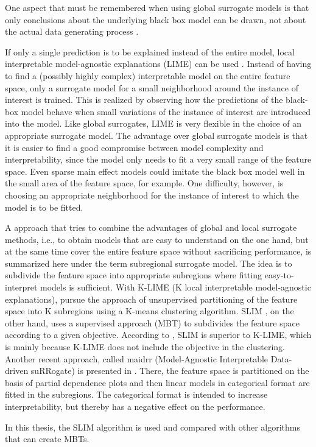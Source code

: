 One aspect that must be remembered when using global surrogate models is that only conclusions about the underlying black box model can be drawn, not about the actual data generating process \citep{Molnar.2019}.


If only a single prediction is to be explained instead of the entire model, local interpretable model-agnostic explanations (LIME) can be used \citep{Ribeiro.2016}. Instead of having to find a (possibly highly complex) interpretable model on the entire feature space, only a surrogate model for a small neighborhood around the instance of interest is trained. This is realized by observing how the predictions of the black-box model behave when small variations of the instance of interest are introduced into the model. Like global surrogates, LIME is very flexible in the choice of an appropriate surrogate model. The advantage over global surrogate models is that it is easier to find a good compromise between model complexity and interpretability, since the model only needs to fit a very small range of the feature space. Even sparse main effect models could imitate the black box model well in the small area of the feature space, for example. One difficulty, however, is choosing an appropriate neighborhood for the instance of interest to which the model is to be fitted.
\citep{Molnar.2019}


A approach that tries to combine the advantages of global and local surrogate methods, i.e., to obtain models that are easy to understand on the one hand, but at the same time cover the entire feature space without sacrificing performance, is summarized here under the term subregional surrogate model.
The idea is to subdivide the feature space into appropriate subregions where fitting easy-to-interpret models is sufficient.
With K-LIME (K local interpretable model-agnostic explanations), \citet{Hall.2017}  pursue the approach of unsupervised partitioning of the feature space into K subregions using a K-means clustering algorithm. 
SLIM \citep{Hu.2020}, on the other hand, uses a supervised approach (MBT) to subdivides the feature space according to a given objective. According to \citep{Hu.2018}, SLIM is superior to K-LIME, which is mainly because K-LIME does not include the objective in the clustering. 
Another recent approach, called maidrr (Model-Agnostic Interpretable Data-driven suRRogate) is presented in \citet{Henckaerts.2022}. There, the feature space is partitioned on the basis of partial dependence plots and then linear models in categorical format are fitted in the subregions. The categorical format is intended to increase interpretability, but thereby has a negative effect on the performance.

In this thesis, the SLIM algorithm is used and compared with other algorithms that can create MBTs.

